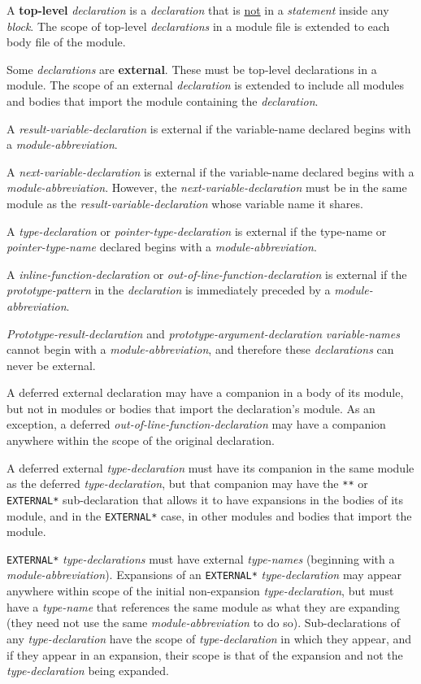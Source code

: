 \documentclass[12pt]{article}
\newcommand{\key}[1]{{\rm \bfseries #1}}
\begin{document}
A \key{top-level} {\em declaration} is a {\em declaration} that is
\underline{not} in a {\em statement} inside any {\em block}.
The scope of top-level {\em declarations} in a module file is extended
to each body file of the module.

Some {\em declarations} are \key{external}\label{EXTERNAL}.
These must be top-level declarations in a module.
The scope of an external
{\em declaration} is extended to include all modules and bodies that
import the module containing the {\em declaration}.

A {\em result-variable-declaration}
is external if the {variable-name} declared begins with a
{\em module-abbreviation}.

A {\em next-variable-declaration}
is external if the {variable-name} declared begins with a
{\em module-abbreviation}.  However, the {\em next-variable-declaration}
must be in the same module as the {\em result-variable-declaration}
whose variable name it shares.

A {\em type-declaration} or {\em pointer-type-declaration}
\label{EXTERNAL-TYPE-NAME}
is external if the {type-name} or {\em pointer-type-name}
declared begins with a
{\em module-abbreviation}.

A {\em inline-function-declaration} or {\em out-of-line-function-declaration}
is external\label{EXTERNAL-FUNCTION}
if the {\em prototype-pattern} in the {\em declaration}
is immediately preceded by a {\em module-abbreviation}.

{\em Prototype-result-declaration} and {\em prototype-argument-declaration}
{\em variable-names} cannot begin with a {\em module-abbreviation},
and therefore these {\em declarations} can never be external.

A deferred external declaration may have a companion in a body of its module,
but not in modules or bodies that import the declaration's module.
As an exception, a deferred {\em out-of-line-function-declaration}
may have a companion
anywhere within the scope of the original declaration.

A deferred external {\em type-declaration} must have its
companion in the same module as the deferred {\em type-declaration},
but that companion may have the {\tt ***} or {\tt *EXTERNAL*}
sub-declaration that allows it to have expansions in the bodies of
its module, and in the {\tt *EXTERNAL*} case, in other modules and
bodies that import the module.

{\tt *EXTERNAL*} {\em type-declarations} must have external {\em type-names}
(beginning with a {\em module-abbreviation}).
Expansions of an {\tt *EXTERNAL*} {\em type-declaration} may appear
anywhere within scope of the initial non-expansion {\em type-declaration},
but must have a {\em type-name} that references the same module
as what they are expanding (they need not use the same
{\em module-abbreviation} to do so).
Sub-declarations of any {\em type-declaration} have the scope of
{\em type-declaration} in which they appear, and if they appear in
an expansion, their scope is that of the expansion and not
the {\em type-declaration} being expanded.  
\end{document}
